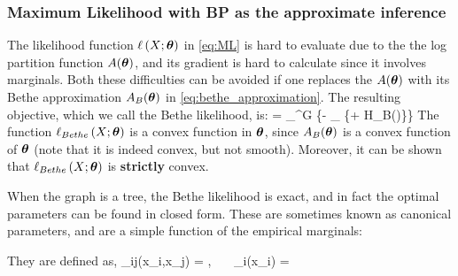 \subsubsection{Maximum Likelihood with BP as the approximate inference}
\label{sec:Bethe_ML}
The likelihood function $\ell\left(X;\boldsymbol{\theta}\right)$ in \eqref{eq:ML} is hard to evaluate due to the the log partition function $A(\boldsymbol{\theta})$, and its gradient is hard to calculate since it involves marginals.
Both these difficulties can be avoided if one replaces the $A(\boldsymbol{\theta})$ with its Bethe approximation $A_B(\boldsymbol{\theta})$ in \eqref{eq:bethe_approximation}.
The resulting objective, which we call the Bethe likelihood, is:
\be
\label{eq:bethe_like}
  = \sup_{\thetav \in \Omega^G} \left\{\mubv \cdot \thetav - \sup_{\tauv \in \lclmargpoly} \left\{\tauv \cdot \thetav + H_B(\tauv)\right\}\right\}
\ee
The function $\ell_{Bethe}\left(X;\boldsymbol{\theta}\right)$ is a convex function in $\boldsymbol{\theta}$, since $A_B(\boldsymbol{\theta})$ is a convex function of $\boldsymbol{\theta}$ (note that it is indeed convex, but not smooth). 
Moreover, it can be shown that $\ell_{Bethe}\left(X; \boldsymbol{\theta}\right)$ is \textbf{strictly} convex. %

When the graph is a tree, the Bethe likelihood is exact, and in fact the optimal parameters can be found in closed form.
These are sometimes known as canonical parameters, and are a simple function of the empirical marginals:

They are defined as,
\be
\label{eq:canonical}
\theta_{ij}(x_i,x_j) = , \ \ \ \theta_i(x_i) = 
\ee

